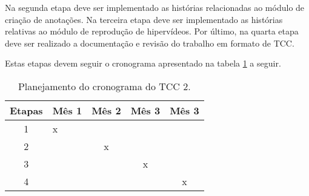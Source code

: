 Na segunda etapa deve ser implementado as histórias relacionadas ao módulo de criação de anotações. Na terceira etapa deve ser implementado as histórias relativas ao módulo de reprodução de hipervídeos. Por último, na quarta etapa deve ser realizado a documentação e revisão do trabalho em formato de TCC.

Estas etapas devem seguir o cronograma apresentado na tabela \ref{tab:plantcc2} a seguir.

\begin{table}[h!]
	\centering
	\begin{tabular}{| c | p{4cm} | c | c | c |}
		\hline
		Etapas & Mês 1 & Mês 2 & Mês 3 & Mês 3 \\
		\hline
		\hline
		1 & x & & & \\
		\hline
		2 & & x & & \\
		\hline		
		3 & & & x & \\
		\hline
		4 & & & & x \\
		\hline
	\end{tabular}
	\caption{Planejamento do cronograma do TCC 2.}
	\label{tab:plantcc2}
\end{table}
